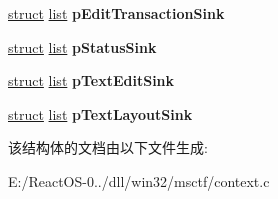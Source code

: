 \begin{DoxyCompactItemize}
\hyperlink{interfacestruct}{struct} \hyperlink{classlist}{list} {\bfseries p\+Edit\+Transaction\+Sink}
\item 
\mbox{\label{structtag_context_ab01839a0ce3a61251e888d0b56ebdeb3}} 
\hyperlink{interfacestruct}{struct} \hyperlink{classlist}{list} {\bfseries p\+Status\+Sink}
\item 
\mbox{\label{structtag_context_a1ff083da747310f76092b0aa1cf4c96d}} 
\hyperlink{interfacestruct}{struct} \hyperlink{classlist}{list} {\bfseries p\+Text\+Edit\+Sink}
\item 
\mbox{\label{structtag_context_a948ecabc062c03bb7f79198f8d77cfa0}} 
\hyperlink{interfacestruct}{struct} \hyperlink{classlist}{list} {\bfseries p\+Text\+Layout\+Sink}
\end{DoxyCompactItemize}


该结构体的文档由以下文件生成\+:\begin{DoxyCompactItemize}
\item 
E\+:/\+React\+O\+S-\/0../dll/win32/msctf/context.\+c\end{DoxyCompactItemize}

